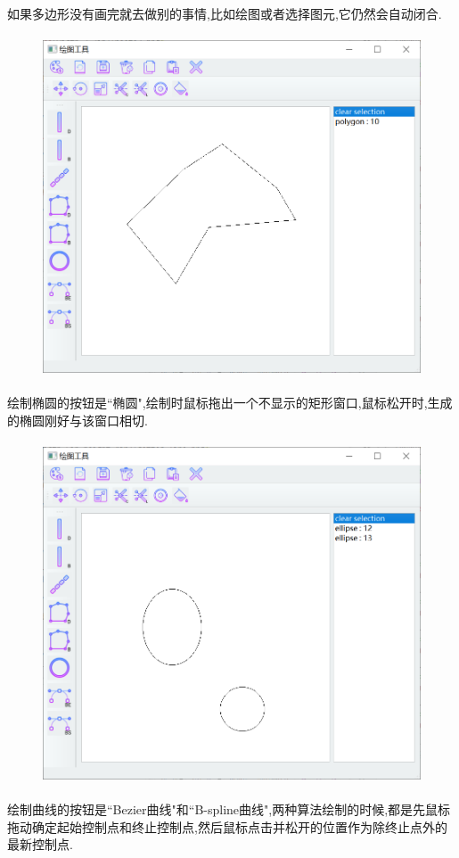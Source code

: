 \documentclass[a4paper,UTF8]{article}
\theoremstyle{definition}
\begin{document}
\indent 如果多边形没有画完就去做别的事情,比如绘图或者选择图元,它仍然会自动闭合.
\begin{figure}[H]
	\includegraphics[width=5in,height=4in]{polygon.png}
\end{figure}
绘制椭圆的按钮是``椭圆",绘制时鼠标拖出一个不显示的矩形窗口,鼠标松开时,生成的椭圆刚好与该窗口相切.
\begin{figure}[H]
	\includegraphics[width=5in,height=4in]{ellipse.png}
\end{figure}
绘制曲线的按钮是``Bezier曲线"和``B-spline曲线",两种算法绘制的时候,都是先鼠标拖动确定起始控制点和终止控制点,然后鼠标点击并松开的位置作为除终止点外的最新控制点.
\end{document}
